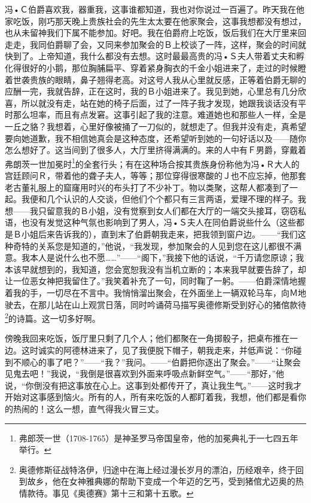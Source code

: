 \documentclass[12pt,oneside]{book}
\begin{document}
冯•Ｃ伯爵喜欢我，器重我，这事谁都知道，我也对你说过一百遍了。昨天我在他家吃饭，刚巧那天晚上贵族社会的先生太太要在他家聚会，这事我想都没有想过，也从未留神我们下属不能参加。好吧。我在伯爵府上吃饭，饭后我们在大厅里来回走走，我同伯爵聊了会，又同来参加聚会的Ｂ上校谈了一阵，这样，聚会的时间就快到了。上帝知道，我什么都没有去想。这时最最高贵的冯•Ｓ夫人带着丈夫和孵化得很好的小鹅，那位胸脯扁平、穿着紧身胸衣的千金小姐进来了，走过的时候瞪着世袭贵族的眼睛，鼻子翘得老高。对这号人我从心里就反感，正等着伯爵无聊的应酬一完，我就告辞，正在这时，我的Ｂ小姐进来了。我见到她，心里总有几分欣喜，所以就没有走，站在她的椅子后面，过了一阵子我才发现，她跟我谈话没有平时那么坦率，而且有点发窘。这事引起了我的注意。难道她也和那些人一样，全是一丘之貉？我想着，心里好像被捅了一刀似的，就想走了。但我并没有走，真希望要向她道歉，我不相信她真会是这种态度，还希望听到她的一句好话以及——随你怎么想好了。这当间到了很多人，大厅里挤得满满的。来的人中有Ｆ男爵，穿戴着弗朗茨一世加冕时\footnote{弗郎茨一世（1708-1765）是神圣罗马帝国皇帝，他的加冕典礼于一七四五年举行。}的全套行头；有在这种场合按其贵族身份称他为冯•Ｒ大人的宫廷顾问Ｒ，带着他的聋子夫人，等等；那位穿得很寒酸的Ｊ也不应忘掉，他那套老古董礼服上的窟窿用时兴的布头打了不少补丁。物以类聚，这帮人都凑到了一起。我便和几个认识的人交谈，但他们个个都只有三言两语，爱理不理的样子。我想——我只留意我的Ｂ小姐，没有觉察到女人们都在大厅的一端交头接耳，窃窃私语，也没有发觉这种气氛也影响到了男人，冯•Ｓ夫人在同伯爵说些什么（这些都是Ｂ小姐后来告诉我的），直到末了伯爵朝我走来，把我领到窗户边。——“我们这种奇特的关系您是知道的，”他说，“我发现，参加聚会的人见到您在这儿都很不满意。我本人是说什么也不愿……”——“阁下，”我接下他的话说，“千万请您原谅；我本该早就想到的，我知道，您会宽恕我没有当机立断的；本来我早就要告辞了，却让一位恶女神把我留住了。”我笑着补充了一句，同时鞠了一躬。——伯爵深情地握着我的手，一切尽在不言中。我悄悄溜出聚会，在外面坐上一辆双轮马车，向Ｍ地驶去，在那儿站在山上观赏日落，同时吟诵荷马描写奥德修斯受到好心的猪倌款待\footnote{奥德修斯征战特洛伊，归途中在海上经过漫长岁月的漂泊，历经艰辛，终于回到故乡，他在女神雅典娜的帮助下变成一个年迈的乞丐，受到猪倌尤迈奥的热情款待。事见《奥德赛》第十三和第十五歌。}的诗篇。这一切多好啊。

傍晚我回来吃饭，饭厅里只剩了几个人；他们都聚在一角掷骰子，把桌布推在一边。这时诚实的阿德林进来了，见了我便脱下帽子，朝我走来，并低声说：“你碰到不顺心的事了吧？”——“我？”我问。——“伯爵把你逐出了聚会。”——“让聚会见鬼去吧！”我说，“我倒是很喜欢到外面来呼吸点新鲜空气。”——“那好，”他说，“你倒没有把这事放在心上。这事到处都传开了，真让我生气。”——这时我才开始对这事感到恼火。所有的人，所有来吃饭的人都盯着我，我想，他们都是看你的热闹的！这么一想，直气得我火冒三丈。
\end{document}
